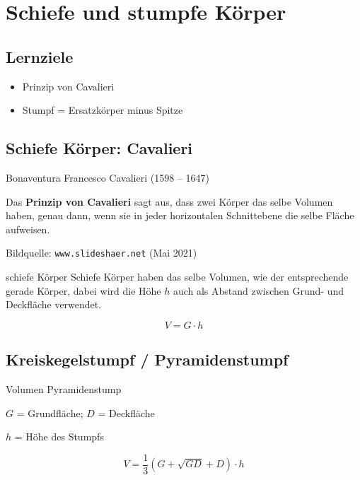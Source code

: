 \section{Schiefe und stumpfe Körper}


\subsection*{Lernziele}
\begin{itemize}
\item Prinzip von Cavalieri
\item Stumpf = Ersatzkörper minus Spitze
\end{itemize}


\newpage


\subsection{Schiefe Körper: Cavalieri}
Bonaventura Francesco Cavalieri (1598 – 1647)

Das \textbf{Prinzip von Cavalieri} sagt aus, dass zwei Körper das
selbe Volumen haben, genau dann, wenn sie in jeder horizontalen
Schnittebene die selbe Fläche aufweisen.

Bildquelle: \texttt{www.slideshaer.net} (Mai 2021)
\vspace{9mm}

\begin{gesetz}{schiefe Körper}{}
  Schiefe Körper haben das selbe Volumen, wie der entsprechende gerade Körper, dabei wird die Höhe $h$ auch als Abstand zwischen Grund- und Deckfläche verwendet.

  $$V = G\cdot{} h$$
\end{gesetz}

\newpage


\subsection{Kreiskegelstumpf / Pyramidenstumpf}




\begin{gesetz}{Volumen Pyramidenstump}{}

  $G$ = Grundfläche; $D$ = Deckfläche

  $h$ = Höhe des Stumpfs
  
  $$V = \frac13 (G + \sqrt{GD} + D)\cdot{}h$$
\end{gesetz}
\newpage


